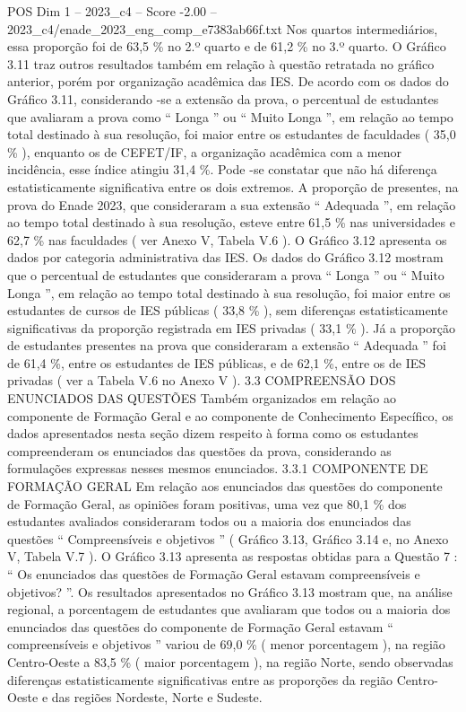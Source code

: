 \begin{textsample}{POS Dim 1 – 2023\_c4 – Score -2.00 – 2023\_c4/enade\_2023\_eng\_comp\_e7383ab66f.txt}
Nos quartos intermediários, essa proporção foi de 63,5 \% no 2.º quarto e de 61,2 \% no 3.º quarto.
O Gráfico 3.11 traz outros resultados também em relação à questão retratada no gráfico anterior, porém por organização acadêmica das IES.
De acordo com os dados do Gráfico 3.11, considerando -se a extensão da prova, o percentual de estudantes que avaliaram a prova como “ Longa ” ou “ Muito Longa ”, em relação ao tempo total destinado à sua resolução, foi maior entre os estudantes de faculdades ( 35,0 \% ), enquanto os de CEFET/IF, a organização acadêmica com a menor incidência, esse índice atingiu 31,4 \%.
Pode -se constatar que não há diferença estatisticamente significativa entre os dois extremos.
A proporção de presentes, na prova do Enade 2023, que consideraram a sua extensão “ Adequada ”, em relação ao tempo total destinado à sua resolução, esteve entre 61,5 \% nas universidades e 62,7 \% nas faculdades ( ver Anexo V, Tabela V.6 ).
O Gráfico 3.12 apresenta os dados por categoria administrativa das IES.
Os dados do Gráfico 3.12 mostram que o percentual de estudantes que consideraram a prova “ Longa ” ou “ Muito Longa ”, em relação ao tempo total destinado à sua resolução, foi maior entre os estudantes de cursos de IES públicas ( 33,8 \% ), sem diferenças estatisticamente significativas da proporção registrada em IES privadas ( 33,1 \% ).
Já a proporção de estudantes presentes na prova que consideraram a extensão “ Adequada ” foi de 61,4 \%, entre os estudantes de IES públicas, e de 62,1 \%, entre os de IES privadas ( ver a Tabela V.6 no Anexo V ). 3.3 COMPREENSÃO DOS ENUNCIADOS DAS QUESTÕES Também organizados em relação ao componente de Formação Geral e ao componente de Conhecimento Específico, os dados apresentados nesta seção dizem respeito à forma como os estudantes compreenderam os enunciados das questões da prova, considerando as formulações expressas nesses mesmos enunciados. 3.3.1 COMPONENTE DE FORMAÇÃO GERAL Em relação aos enunciados das questões do componente de Formação Geral, as opiniões foram positivas, uma vez que 80,1 \% dos estudantes avaliados consideraram todos ou a maioria dos enunciados das questões “ Compreensíveis e objetivos ” ( Gráfico 3.13, Gráfico 3.14 e, no Anexo V, Tabela V.7 ).
O Gráfico 3.13 apresenta as respostas obtidas para a Questão 7 : “ Os enunciados das questões de Formação Geral estavam compreensíveis e objetivos? ”.
Os resultados apresentados no Gráfico 3.13 mostram que, na análise regional, a porcentagem de estudantes que avaliaram que todos ou a maioria dos enunciados das questões do componente de Formação Geral estavam “ compreensíveis e objetivos ” variou de 69,0 \% ( menor porcentagem ), na região Centro-Oeste a 83,5 \% ( maior porcentagem ), na região Norte, sendo observadas diferenças estatisticamente significativas entre as proporções da região Centro-Oeste e das regiões Nordeste, Norte e Sudeste.

\end{textsample}
